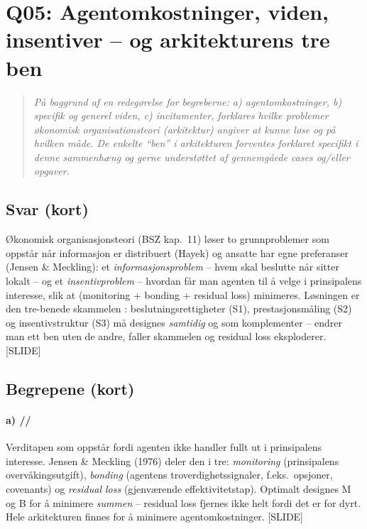 \section{Q05: Agentomkostninger, viden, insentiver -- og arkitekturens tre ben}\label{q:05}

\begin{quote}
\emph{På baggrund af en redegørelse for begreberne: a) agentomkostninger, b) specifik og generel viden, c) incitamenter, forklares hvilke problemer økonomisk organisationsteori (arkitektur) angiver at kunne løse og på hvilken måde. De enkelte ``ben'' i arkitekturen forventes forklaret specifikt i denne sammenhæng og gerne understøttet af gennemgåede cases og/eller opgaver.}
\end{quote}

\subsection*{Svar (kort)}
Økonomisk organisasjonsteori (BSZ kap.\ 11) løser to grunnproblemer som oppstår når informasjon er distribuert (Hayek) og ansatte har egne preferanser (Jensen \& Meckling): et \emph{informasjonsproblem} -- hvem skal beslutte når  sitter lokalt -- og et \emph{insentivproblem} -- hvordan får man agenten til å velge i prinsipalens interesse, slik at  (monitoring + bonding + residual loss) minimeres. Løsningen er den tre-benede skammelen : beslutningsrettigheter (S1), prestasjonsmåling (S2) og insentivstruktur (S3) må designes \emph{samtidig} og som komplementer -- endrer man ett ben uten de andre, faller skammelen og residual loss eksploderer. [SLIDE]

\subsection*{Begrepene (kort)}

\paragraph{a) \quad\SOne/\STwo/\SThree}
Verditapen som oppstår fordi agenten ikke handler fullt ut i prinsipalens interesse. Jensen \& Meckling (1976) deler den i tre: \emph{monitoring} (prinsipalens overvåkingsutgift), \emph{bonding} (agentens troverdighetssignaler, f.eks.\ opsjoner, covenants) og \emph{residual loss} (gjenværende effektivitetstap). Optimalt designes M og B for å minimere \emph{summen} -- residual loss fjernes ikke helt fordi det er for dyrt. Hele arkitekturen finnes for å minimere agentomkostninger. [SLIDE]

